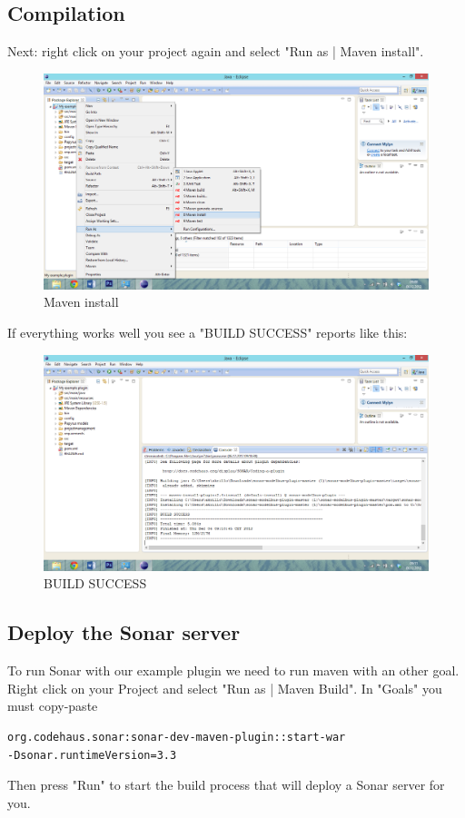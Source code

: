 \subsection{Compilation}
Next: right click on your project again and select "Run as | Maven install".
\begin{figure}[h]
	\centering
		\includegraphics[width=\textwidth]{maveninstall}
	\caption{Maven install}
	\label{fig:maveninstall}
\end{figure} 
If everything works well you see a "BUILD SUCCESS" reports like this:
\begin{figure}[h]
	\centering
		\includegraphics[width=\textwidth]{buildsuccess}
	\caption{BUILD SUCCESS}
	\label{fig:buildsuccess}
\end{figure}



\subsection{Deploy the Sonar server}
To run Sonar with our example plugin we need to run maven with an other goal. Right click on your Project and select "Run as | Maven Build". In "Goals" you must copy-paste 
\begin{verbatim}
org.codehaus.sonar:sonar-dev-maven-plugin::start-war
-Dsonar.runtimeVersion=3.3
\end{verbatim}
Then press "Run" to start the build process that will deploy a Sonar server for you. 

